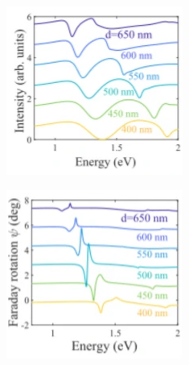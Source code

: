 \documentclass[13pt]{article}
\begin{document}
\begin{figure}[hbt!]
	\centering
	\begin{subfigure}[]{.49\linewidth}
		\centering
		\includegraphics[width=\linewidth]{Figures/figure4a.png}
		\caption{}
		\label{fig:figure4a}
	\end{subfigure}
	\hfill
	\begin{subfigure}[]{.49\linewidth}
		\centering
		\includegraphics[width=\linewidth]{Figures/figure4b.png}
		\caption{}
		\label{fig:figure4b}
	\end{subfigure}
	

\end{figure}
\end{document}
